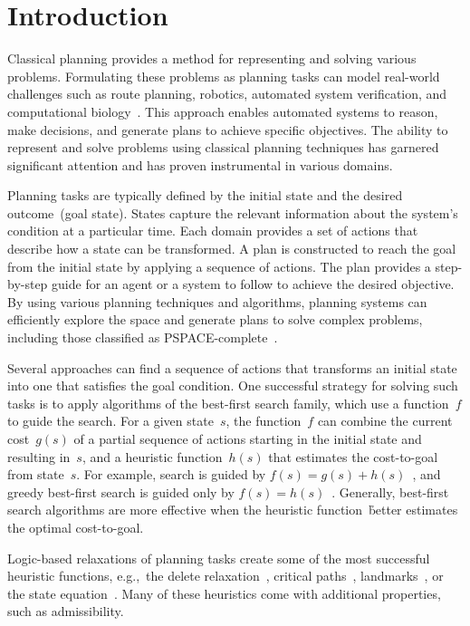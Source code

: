\chapter{Introduction}
\label{chapter:introduction}

Classical planning provides a method for representing and solving various problems. Formulating these problems as planning tasks can model real-world challenges such as route planning, robotics, automated system verification, and computational biology~\cite{edelkamp2012heuristic}. This approach enables automated systems to reason, make decisions, and generate plans to achieve specific objectives. The ability to represent and solve problems using classical planning techniques has garnered significant attention and has proven instrumental in various domains.

Planning tasks are typically defined by the initial state and the desired outcome~(goal state). States capture the relevant information about the system's condition at a particular time. Each domain provides a set of actions that describe how a state can be transformed. A plan is constructed to reach the goal from the initial state by applying a sequence of actions. The plan provides a step-by-step guide for an agent or a system to follow to achieve the desired objective. By using various planning techniques and algorithms, planning systems can efficiently explore the space and generate plans to solve complex problems, including those classified as PSPACE-complete~\cite{bylander1994computational}.

Several approaches can find a sequence of actions that transforms an initial state into one that satisfies the goal condition. One successful strategy for solving such tasks is to apply algorithms of the best-first search family, which use a function~$f$ to guide the search. For a given state~$s$, the function~$f$ can combine the current cost~$g(s)$ of a partial sequence of actions starting in the initial state and resulting in~$s$, and a heuristic function~$h(s)$ that estimates the cost-to-goal from state~$s$. For example, \astar search is guided by $f(s)=g(s)+h(s)$~\cite{hart1968formal}, and greedy best-first search is guided only by $f(s)=h(s)$~\cite{doran1966experiments}. Generally, best-first search algorithms are more effective when the heuristic function~\h better estimates the optimal cost-to-goal.

Logic-based relaxations of planning tasks create some of the most successful heuristic functions, e.g.,~the delete relaxation~\cite{hoffmann2001ff}, critical paths~\cite{haslum2004admissible}, landmarks~\cite{hoffmann2004ordered,karpas2009cost}, or the state equation~\cite{bonet2013admissible}. Many of these heuristics come with additional properties, such as admissibility.

